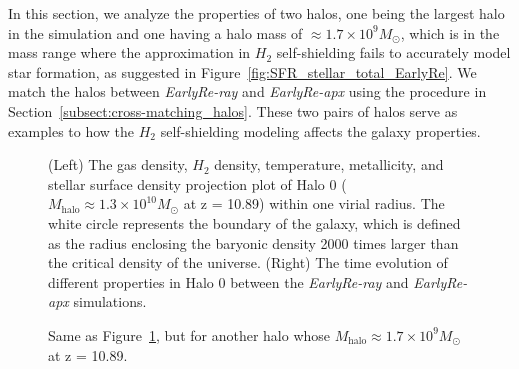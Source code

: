\documentclass[linenumbers, twocolumn]{aastex631}
\begin{document}
In this section, we analyze the properties of two halos, one being the largest halo in the simulation and one having a halo mass of $\approx 1.7\times 10^{9} M_\odot$, which is in the mass range where the approximation in $H_{2}$ self-shielding fails to accurately model star formation, as suggested in Figure~\ref{fig:SFR_stellar_total_EarlyRe}. We match the halos between \textit{EarlyRe-ray} and \textit{EarlyRe-apx} using the procedure in Section~\ref{subsect:cross-matching_halos}. These two pairs of halos serve as examples to how the $H_{2}$ self-shielding modeling affects the galaxy properties. 

\begin{figure}
	\caption{(Left) The gas density, $H_{2}$ density, temperature, metallicity, and stellar surface density projection plot of Halo 0 ($M_{\mathrm{halo}} \approx 1.3\times 10^{10} M_\odot$ at z = 10.89) within one virial radius. The white circle represents the boundary of the galaxy, which is defined as the radius enclosing the baryonic density 2000 times larger than the critical density of the universe. (Right) The time evolution of different properties in Halo 0 between the \textit{EarlyRe-ray} and \textit{EarlyRe-apx} simulations.}
	\label{fig:Halo0-0_comparison}
\end{figure}

\begin{figure}
	\caption{Same as Figure~\ref{fig:Halo0-0_comparison}, but for another halo whose $M_{\mathrm{halo}} \approx 1.7\times 10^{9} M_\odot$ at z = 10.89.}
	\label{fig:Halo8-9_comparison}
\end{figure}
\end{document}
